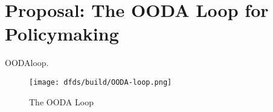 \section{Proposal: The OODA Loop for Policymaking}

\ac{OODAloop}.

\begin{figure}[h]
    \centering\CaptionFontSize
    \texttt{[image: dfds/build/OODA-loop.png]}
    \caption[The OODA Loop]{The OODA Loop}
    \label{fig-ooda-loop}
\end{figure}





